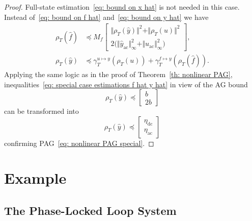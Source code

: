 \documentclass[letterpaper, 10 pt, conference]{ieeeconf}
\newcommand{\ac}{_\mathrm{ac}}
\newcommand{\dc}{_\mathrm{dc}}
\newcommand{\guy}{\gamma^{u \mapsto y}}
\newcommand{\gfy}{\gamma^{f \mapsto y}}
\newcommand{\pb}[1]{\big( #1 \big)}
\newcommand{\norm}[1]{\Vert #1 \Vert}
\begin{document}
\begin{proof}
    Full-state estimation~\eqref{eq: bound on x hat} is not needed in this case. Instead of~\eqref{eq: bound on f hat} and~\eqref{eq: bound on y hat} we have
    \begin{subequations}
        \label{eq: special case estimations f hat y hat}
        \begin{align}
            \rho_T(\hat f) &\preceq M_f
            \begin{bmatrix}
                \norm{\rho_T(\hat y)}^2 + \norm{\rho_T(u)}^2 \\
                2\pb{\norm{\hat y\ac}_\infty^2 + \norm{u\ac}_\infty^2}
            \end{bmatrix}, \\
            \rho_T(\hat y) &\preceq \guy_T(\rho_T(u))
            + \gfy_T(\rho_T(\hat f)).
        \end{align}
    \end{subequations}
    Applying the same logic as in the proof of Theorem~\ref{th: nonlinear PAG}, inequalities~\eqref{eq: special case estimations f hat y hat} in view of the AG bound
    \begin{equation}
        \rho_T(\hat y) \preceq \begin{bmatrix}
            b \\ 2b
        \end{bmatrix}
    \end{equation}
    can be transformed into
    \begin{equation}
        \rho_T(\hat y) \preceq \begin{bmatrix}
            \eta\dc \\ \eta\ac
        \end{bmatrix}
    \end{equation}
    confirming PAG~\eqref{eq: nonlinear PAG special}.
\end{proof}

\section{Example}
\label{se: example}

\subsection{The Phase-Locked Loop System}
\end{document}
